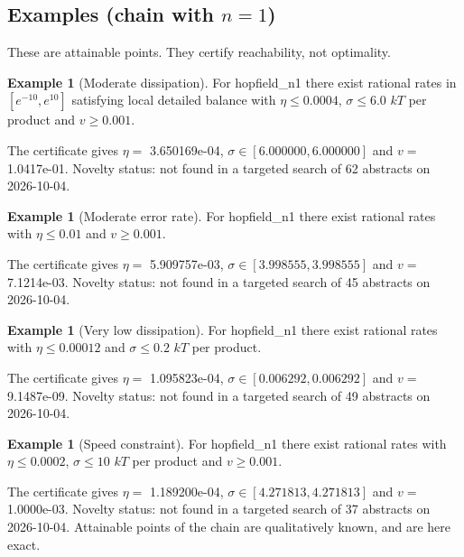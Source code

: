 \documentclass[11pt]{article}
\theoremstyle{definition}\newtheorem{definition}[theorem]{Definition}\newtheorem{example}[theorem]{Example}
\begin{document}
\subsection{\texorpdfstring{Examples (chain with \(n=1\))}{Examples (chain with n=1)}}\label{examples-chain-with-n1}

These are attainable points. They certify reachability, not optimality.

\begin{example}[Moderate dissipation]
For hopfield\_n1 there exist rational rates in \([e^{-10},e^{10}]\) satisfying local detailed balance with \(\eta\le 0.0004\), \(\sigma\le 6.0\) \(kT\) per product and \(v\ge 0.001\).
\end{example}

The certificate gives \(\eta=\) 3.650169e-04, \(\sigma\in[6.000000,6.000000]\) and \(v=\) 1.0417e-01. Novelty status: not found in a targeted search of 62 abstracts on 2026-10-04.

\begin{example}[Moderate error rate]
For hopfield\_n1 there exist rational rates with \(\eta\le 0.01\) and \(v\ge 0.001\).
\end{example}

The certificate gives \(\eta=\) 5.909757e-03, \(\sigma\in[3.998555,3.998555]\) and \(v=\) 7.1214e-03. Novelty status: not found in a targeted search of 45 abstracts on 2026-10-04.

\begin{example}[Very low dissipation]
For hopfield\_n1 there exist rational rates with \(\eta\le 0.00012\) and \(\sigma\le 0.2\) \(kT\) per product.
\end{example}

The certificate gives \(\eta=\) 1.095823e-04, \(\sigma\in[0.006292,0.006292]\) and \(v=\) 9.1487e-09. Novelty status: not found in a targeted search of 49 abstracts on 2026-10-04.

\begin{example}[Speed constraint]
For hopfield\_n1 there exist rational rates with \(\eta\le 0.0002\), \(\sigma\le 10\) \(kT\) per product and \(v\ge 0.001\).
\end{example}

The certificate gives \(\eta=\) 1.189200e-04, \(\sigma\in[4.271813,4.271813]\) and \(v=\) 1.0000e-03. Novelty status: not found in a targeted search of 37 abstracts on 2026-10-04. Attainable points of the chain are qualitatively known, and are here exact.
\end{document}

